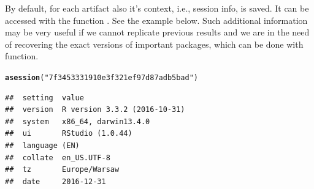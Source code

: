 \documentclass[nojss]{jss}\usepackage[]{graphicx}\usepackage[]{color}
\makeatletter
\newcommand{\hlstr}[1]{\textcolor[rgb]{0.192,0.494,0.8}{#1}}%
\newcommand{\hlstd}[1]{\textcolor[rgb]{0.345,0.345,0.345}{#1}}%
\newcommand{\hlkwd}[1]{\textcolor[rgb]{0.737,0.353,0.396}{\textbf{#1}}}%
\newenvironment{kframe}{%
 \def\at@end@of@kframe{}%
 \ifinner\ifhmode%
  \def\at@end@of@kframe{\end{minipage}}%
  \begin{minipage}{\columnwidth}%
 \fi\fi%
 \def\FrameCommand##1{\hskip\@totalleftmargin \hskip-\fboxsep
 \colorbox{shadecolor}{##1}\hskip-\fboxsep
     \hskip-\linewidth \hskip-\@totalleftmargin \hskip\columnwidth}%
 \MakeFramed {\advance\hsize-\width
   \@totalleftmargin\z@ \linewidth\hsize
   \@setminipage}}%
 {\par\unskip\endMakeFramed%
 \at@end@of@kframe}
\newenvironment{knitrout}{}{} %
\makeatother
\begin{document}

By default, for each artifact also it's context, i.e., session info, is saved. It can be accessed with the function . See the example below. Such additional information may be very useful if we cannot replicate previous results and we are in the need of recovering the exact versions of important packages, which can be done with  function.

\begin{knitrout}
\color{fgcolor}\begin{kframe}
\begin{alltt}
\hlkwd{asession}\hlstd{(}\hlstr{"7f3453331910e3f321ef97d87adb5bad"}\hlstd{)}
\end{alltt}


{\ttfamily\noindent\itshape\color{messagecolor}{\#\# Session info --------------------------------------------------------------}}\begin{verbatim}
##  setting  value                       
##  version  R version 3.3.2 (2016-10-31)
##  system   x86_64, darwin13.4.0        
##  ui       RStudio (1.0.44)            
##  language (EN)                        
##  collate  en_US.UTF-8                 
##  tz       Europe/Warsaw               
##  date     2016-12-31
\end{verbatim}



\end{kframe}
\end{knitrout}
\end{document}
